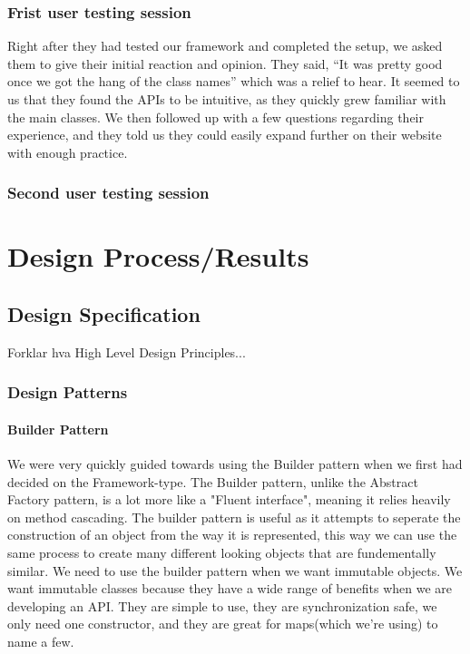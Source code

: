 \documentclass[12pt]{article}
\begin{document}
        \subsubsection{Frist user testing session}
        Right after they had tested our framework and completed the setup, we asked them to give their initial reaction and opinion. They said, “It was pretty good once we got the hang of the class names” which was a relief to hear. It seemed to us that they found the APIs to be intuitive, as they quickly grew familiar with the main classes. We then followed up with a few questions regarding their experience, and they told us they could easily expand further on their website with enough practice.

        \subsubsection{Second user testing session}

\section{Design Process/Results}

    \subsection{Design Specification}
    Forklar hva High Level Design Principles...

        \subsubsection{Design Patterns}

        \paragraph{Builder Pattern}
        We were very quickly guided towards using the Builder pattern when we first had decided on the Framework-type. The Builder pattern, unlike the Abstract Factory pattern, is a lot more like a "Fluent interface", meaning it relies heavily on method cascading.
        The builder pattern is useful as it attempts to seperate the construction of an object from the way it is represented, this way we can use the same process to create many different looking objects that are fundementally similar.
        We need to use the builder pattern when we want immutable objects. We want immutable classes because they have a wide range of benefits when we are developing an API. They are simple to use, they are synchronization safe, we only need one constructor, and they are great for maps(which we're using) to name a few.
\end{document}
